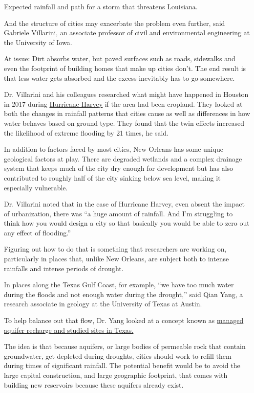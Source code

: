 Expected rainfall and path for a storm that threatens Louisiana.

And the structure of cities may exacerbate the problem even further,
said Gabriele Villarini, an associate professor of civil and
environmental engineering at the University of Iowa.

At issue: Dirt absorbs water, but paved surfaces such as roads,
sidewalks and even the footprint of building homes that make up cities
don't. The end result is that less water gets absorbed and the excess
inevitably has to go somewhere.

Dr. Villarini and his colleagues researched what might have happened in
Houston in 2017 during
\href{https://www.nytimes.com/video/us/100000005395222/hurricane-harveys-damage-in-texas.html}{Hurricane
Harvey} if the area had been cropland. They looked at both the changes
in rainfall patterns that cities cause as well as differences in how
water behaves based on ground type. They found that the twin effects
increased the likelihood of extreme flooding by 21 times, he said.

In addition to factors faced by most cities, New Orleans has some unique
geological factors at play. There are degraded wetlands and a complex
drainage system that keeps much of the city dry enough for development
but has also contributed to roughly half of the city sinking below sea
level, making it especially vulnerable.

Dr. Villarini noted that in the case of Hurricane Harvey, even absent
the impact of urbanization, there was ``a huge amount of rainfall. And
I'm struggling to think how you would design a city so that basically
you would be able to zero out any effect of flooding.''

Figuring out how to do that is something that researchers are working
on, particularly in places that, unlike New Orleans, are subject both to
intense rainfalls and intense periods of drought.

In places along the Texas Gulf Coast, for example, ``we have too much
water during the floods and not enough water during the drought,'' said
Qian Yang, a research associate in geology at the University of Texas at
Austin.

To help balance out that flow, Dr. Yang looked at a concept known as
\href{https://iopscience.iop.org/article/10.1088/1748-9326/ab148e}{managed
aquifer recharge and studied sites in Texas.}

The idea is that because aquifers, or large bodies of permeable rock
that contain groundwater, get depleted during droughts, cities should
work to refill them during times of significant rainfall. The potential
benefit would be to avoid the large capital construction, and large
geographic footprint, that comes with building new reservoirs because
these aquifers already exist.

